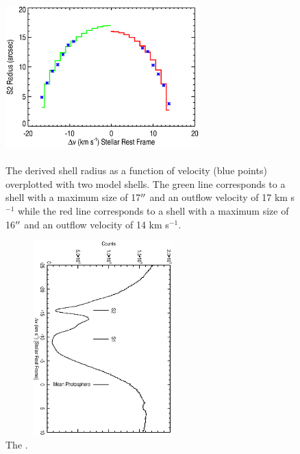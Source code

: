 \documentclass[preprint2]{aastex}
\begin{document}
\begin{figure}
\includegraphics[trim=45pt 0pt 30pt 0pt, width=7.5cm, height=6.5cm]{s2_size.eps}
\caption{The derived shell radius as a function of velocity (blue points) overplotted with two model shells. The green line corresponds to a shell with a maximum size of 17$\mbox{$^{\prime\prime}$}$ and an outflow velocity of 17 km s${}^{-1}$ while the red line corresponds to a shell with a maximum size of 16$\mbox{$^{\prime\prime}$}$ and an outflow velocity of 14 km s${}^{-1}$.}
\label{fig:fig4}
\end{figure}

\clearpage

\begin{figure}
\includegraphics[angle=90, trim=5pt 0pt 0pt 0pt,width=7.5cm, height=7.5cm]{aori_mcdonald.ps}
\caption{The .}
\label{fig:fig5}
\end{figure}

\clearpage
\end{document}
